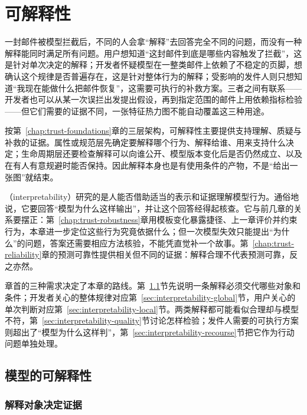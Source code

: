 \chapter{可解释性}
\label{chap:trust-interpretability}

一封邮件被模型拦截后，不同的人会拿“解释”去回答完全不同的问题，而没有一种解释能同时满足所有问题。用户想知道“这封邮件到底是哪些内容触发了拦截”，这是针对单次决定的解释；开发者怀疑模型在一整类邮件上依赖了不稳定的页脚，想确认这个规律是否普遍存在，这是针对整体行为的解释；受影响的发件人则只想知道“我现在能做什么把邮件恢复”，这需要可执行的补救方案。三者之间有联系——开发者也可以从某一次误拦出发提出假设，再到指定范围的邮件上用依赖指标检验——但它们需要的证据不同，一张特征热力图不能自动覆盖这三种用途。

按第~\ref{chap:trust-foundations}章的三层架构，可解释性主要提供支持理解、质疑与补救的证据。属性或规范层先确定要解释哪个行为、解释给谁、用来支持什么决定；生命周期层还要检查解释可以向谁公开、模型版本变化后是否仍然成立、以及在有人有意规避时能否保持。因此解释本身也是有使用条件的产物，不是“给出一张图”就结束。

（interpretability）研究的是人能否借助适当的表示和证据理解模型行为。通俗地说，它要回答“模型为什么这样输出”，并让这个回答经得起核查。它与前几章的关系要摆正：第~\ref{chap:trust-robustness}章用模板变化暴露捷径、上一章评价并约束行为，本章进一步定位这些行为究竟依据什么；但一次模型失效只能提出“为什么”的问题，答案还需要相应方法核验，不能凭直觉补一个故事。第~\ref{chap:trust-reliability}章的预测可靠性提供相关但不同的证据：解释合理不代表预测可靠，反之亦然。

章首的三种需求决定了本章的路线。第~\ref{sec:interpretability-purpose}节先说明一条解释必须交代哪些对象和条件；开发者关心的整体规律对应第~\ref{sec:interpretability-global}节，用户关心的单次判断对应第~\ref{sec:interpretability-local}节。两类解释都可能看似合理却与模型不符，第~\ref{sec:interpretability-quality}节讨论怎样检验；发件人需要的可执行方案则超出了“模型为什么这样判”，第~\ref{sec:interpretability-recourse}节把它作为行动问题单独处理。

\section{模型的可解释性}
\label{sec:interpretability-purpose}

\subsection{解释对象决定证据}
\label{sec:interpretability-target}

